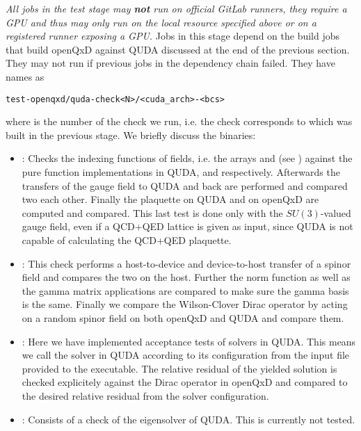 \emph{All jobs in the test stage may \textbf{not} run on official GitLab runners, they require a GPU and thus may only run on the local resource specified above or on a registered runner exposing a GPU.} Jobs in this stage depend on the build jobs that build openQxD against QUDA discussed at the end of the previous section. They may not run if previous jobs in the dependency chain failed. They have names as
\begin{verbatim}
test-openqxd/quda-check<N>/<cuda_arch>-<bcs>
\end{verbatim}
where  is the number of the check we run, i.e. the check corresponds to  which was built in the previous stage. We briefly discuss the binaries:
\begin{itemize}
  \item {}: Checks the indexing functions of fields, i.e. the arrays  and  (see ) against the pure function implementations in QUDA,  and  respectively. Afterwards the transfers of the gauge field to QUDA and back are performed and compared two each other. Finally the plaquette on QUDA and on openQxD are computed and compared. This last test is done only with the $SU(3)$-valued gauge field, even if a QCD+QED lattice is given as input, since QUDA is not capable of calculating the QCD+QED plaquette.
  \item {}: This check performs a host-to-device and device-to-host transfer of a spinor field and compares the two on the host. Further the norm function as well as the gamma matrix applications are compared to make sure the gamma basis is the same. Finally we compare the Wilson-Clover Dirac operator by acting on a random spinor field on both openQxD and QUDA and compare them.
  \item {}: Here we have implemented acceptance tests of solvers in QUDA. This means we call the solver in QUDA according to its configuration from the input file provided to the executable. The relative residual of the yielded solution is checked explicitely against the Dirac operator in openQxD and compared to the desired relative residual from the solver configuration.
  \item {}: Consists of a check of the eigensolver of QUDA. This is currently not tested.
\end{itemize}

